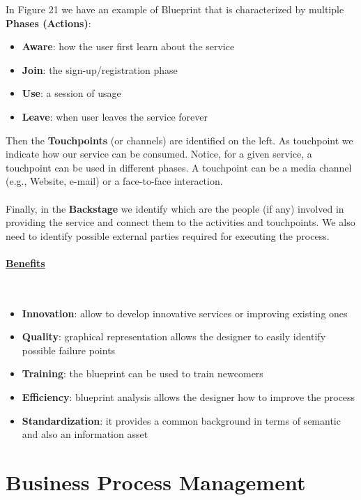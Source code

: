 \documentclass[10pt,a4paper]{article}
\newcommand{\myparagraph}[1]{\paragraph{\uline{#1}}\mbox{}\\[0.05in]}
\begin{document}
In Figure 21 we have an example of Blueprint that is characterized by multiple \textbf{Phases (Actions)}:
\begin{itemize}
	\item \textbf{Aware}: how the user first learn about the service
	\item \textbf{Join}: the sign-up/registration phase
	\item \textbf{Use}: a session of usage
	\item \textbf{Leave}: when user leaves the service forever
\end{itemize}
Then the \textbf{Touchpoints} (or channels) are identified on the left. As touchpoint we indicate how our service can be consumed. Notice, for a given service, a touchpoint can be used in different phases. A touchpoint can be a media channel (e.g., Website, e-mail) or a face-to-face interaction. \\ \\
Finally, in the \textbf{Backstage} we identify which are the people (if any) involved in providing the service and connect them to the activities and touchpoints. We also need to identify possible external parties required for executing the process.
\myparagraph{Benefits}
\begin{itemize}
	\item \textbf{Innovation}: allow to develop innovative services or improving existing ones
	\item \textbf{Quality}: graphical representation allows the designer to easily identify possible failure points
	\item \textbf{Training}: the blueprint can be used to train newcomers
	\item \textbf{Efficiency}: blueprint analysis allows the designer how to improve the process
	\item \textbf{Standardization}: it provides a common background in terms of semantic and also an information asset
\end{itemize}
\section{\LARGE Business Process Management}
\end{document}
